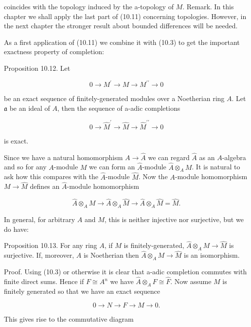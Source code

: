\documentclass{standalone}
\theoremstyle{definition}
\theoremstyle{remark}
\begin{document}
coincides with the topology induced by the a-topology of $M$. Remark. In this chapter we shall apply the last part of (10.11) concerning topologies. However, in the next chapter the stronger result about bounded differences will be needed.

As a first application of (10.11) we combine it with (10.3) to get the important exactness property of completion:

Proposition 10.12. Let

\[
0 \rightarrow M^{\prime} \rightarrow M \rightarrow M^{\prime \prime} \rightarrow 0
\]

be an exact sequence of finitely-generated modules over a Noetherian ring $A$. Let $\mathfrak{a}$ be an ideal of $A$, then the sequence of a-adic completions

\[
0 \rightarrow \hat{M}^{\prime} \rightarrow \hat{M} \rightarrow \hat{M}^{\prime \prime} \rightarrow 0
\]

is exact.

Since we have a natural homomorphism $A \rightarrow \hat{A}$ we can regard $\hat{A}$ as an $A$-algebra and so for any $A$-module $M$ we can form an $\hat{A}$-module $\hat{A} \otimes_{A} M$. It is natural to ask how this compares with the $\hat{A}$-module $\hat{M}$. Now the $A$-module homomorphism $M \rightarrow \hat{M}$ defines an $\hat{A}$-module homomorphism

\[
\hat{A} \otimes_{A} M \rightarrow \hat{A} \otimes_{A} \hat{M} \rightarrow \hat{A} \otimes_{A} \hat{M}=\hat{M} .
\]

In general, for arbitrary $A$ and $M$, this is neither injective nor surjective, but we do have:

Proposition 10.13. For any ring $A$, if $M$ is finitely-generated, $\hat{A} \otimes_{A} M \rightarrow \hat{M}$ is surjective. If, moreover, $A$ is Noetherian then $\hat{A} \otimes_{A} M \rightarrow \hat{M}$ is an isomorphism.

Proof. Using (10.3) or otherwise it is clear that a-adic completion commutes with finite direct sums. Hence if $F \cong A^{n}$ we have $\hat{A} \otimes_{A} F \cong \hat{F}$. Now assume $M$ is finitely generated so that we have an exact sequence

\[
0 \rightarrow N \rightarrow F \rightarrow M \rightarrow 0 .
\]

This gives rise to the commutative diagram

\begin{center}
\end{center}
\end{document}
